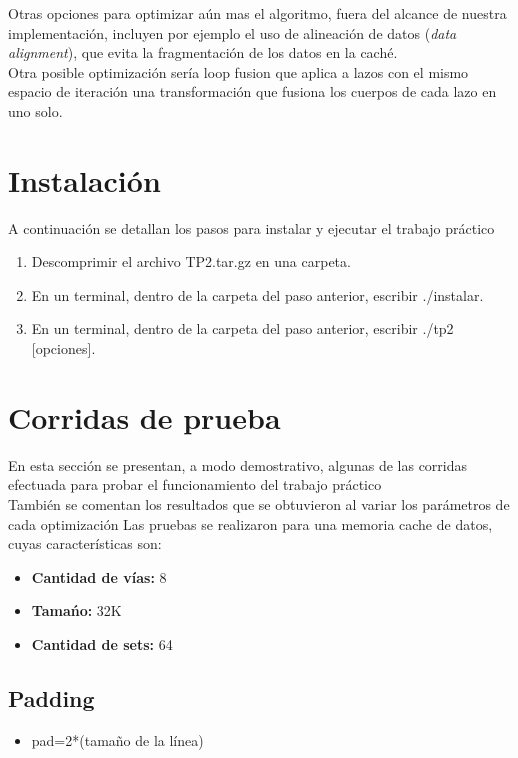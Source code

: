 \documentclass[a4paper,10pt]{article}
\begin{document}
Otras opciones para optimizar a\'un mas el algoritmo, fuera del alcance de nuestra implementaci\'on, incluyen por ejemplo el uso de alineaci\'on de datos (\textit{data alignment}), que evita la fragmentaci\'on de los datos en la cach\'e.\\
Otra posible optimizaci\'on ser\'ia loop fusion que aplica a lazos con el mismo espacio de iteraci\'on una transformaci\'on que fusiona los cuerpos de cada lazo en uno solo.


\section{Instalaci\'on}
A continuaci\'on se detallan los pasos para instalar y ejecutar el trabajo pr\'actico
\begin{enumerate}
 \item Descomprimir el archivo TP2.tar.gz en una carpeta.
\item 
En un terminal, dentro de la carpeta del paso anterior, escribir ./instalar.
\item 
En un terminal, dentro de la carpeta del paso anterior, escribir ./tp2 [opciones].
\end{enumerate}





\section{Corridas de prueba}

En esta secci\'on se presentan, a modo demostrativo, algunas de las corridas efectuada para probar el funcionamiento del trabajo pr\'actico\\
Tambi\'en se comentan los resultados que se obtuvieron al variar los par\'ametros de cada optimizaci\'on
Las pruebas se realizaron para una memoria cache de datos, cuyas caracter\'isticas son:

\begin{itemize}
 \item \textbf{Cantidad de v\'ias:} 8
 \item \textbf{Tama\'no:} 32K
\item \textbf{Cantidad de sets:} 64
\end{itemize}


\subsection*{Padding}
\begin{itemize}
\item pad=2*(tama\~no de la l\'inea)\end{itemize}
\end{document}
